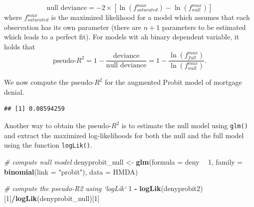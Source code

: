 \documentclass[]{book}
\newenvironment{Shaded}{\begin{snugshade}}{\end{snugshade}}
\newcommand{\KeywordTok}[1]{\textcolor[rgb]{0.13,0.29,0.53}{\textbf{#1}}}
\newcommand{\DataTypeTok}[1]{\textcolor[rgb]{0.13,0.29,0.53}{#1}}
\newcommand{\DecValTok}[1]{\textcolor[rgb]{0.00,0.00,0.81}{#1}}
\newcommand{\StringTok}[1]{\textcolor[rgb]{0.31,0.60,0.02}{#1}}
\newcommand{\CommentTok}[1]{\textcolor[rgb]{0.56,0.35,0.01}{\textit{#1}}}
\newcommand{\OperatorTok}[1]{\textcolor[rgb]{0.81,0.36,0.00}{\textbf{#1}}}
\newcommand{\NormalTok}[1]{#1}
\theoremstyle{definition}
\theoremstyle{definition}
\theoremstyle{definition}
\theoremstyle{remark}
\begin{document}
\[\text{null deviance} = -2 \times \left[\ln(f^{max}_{saturated}) - \ln(f^{max}_{null}) \right]\]
where \(f^{max}_{saturated}\) is the maximized likelihood for a model
which assumes that each observation has its own parameter (there are
\(n+1\) parameters to be estimated which leads to a perfect fit). For
models wit ah binary dependent variable, it holds that
\[\text{pseudo-}R^2 = 1 - \frac{\text{deviance}}{\text{null deviance}} = 1- \frac{\ln(f^{max}_{full})}{\ln(f^{max}_{null})}.\]

We now compute the \(\text{pseudo-}R^2\) for the augmented Probit model
of mortgage denial.

\begin{Shaded}
\end{Shaded}

\begin{verbatim}
## [1] 0.08594259
\end{verbatim}

Another way to obtain the \(\text{pseudo-}R^2\) is to estimate the null
model using \texttt{glm()} and extract the maximized log-likelihoods for
both the null and the full model using the function \texttt{logLik()}.

\begin{Shaded}
\begin{Highlighting}[]
\CommentTok{# compute null model}
\NormalTok{denyprobit_null <-}\StringTok{ }\KeywordTok{glm}\NormalTok{(}\DataTypeTok{formula =}\NormalTok{ deny }\OperatorTok{~}\StringTok{ }\DecValTok{1}\NormalTok{, }
                       \DataTypeTok{family =} \KeywordTok{binomial}\NormalTok{(}\DataTypeTok{link =} \StringTok{"probit"}\NormalTok{), }
                       \DataTypeTok{data =}\NormalTok{ HMDA)}

\CommentTok{# compute the pseudo-R2 using `logLik`}
\DecValTok{1} \OperatorTok{-}\StringTok{ }\KeywordTok{logLik}\NormalTok{(denyprobit2)[}\DecValTok{1}\NormalTok{]}\OperatorTok{/}\KeywordTok{logLik}\NormalTok{(denyprobit_null)[}\DecValTok{1}\NormalTok{]}
\end{Highlighting}
\end{Shaded}
\end{document}
